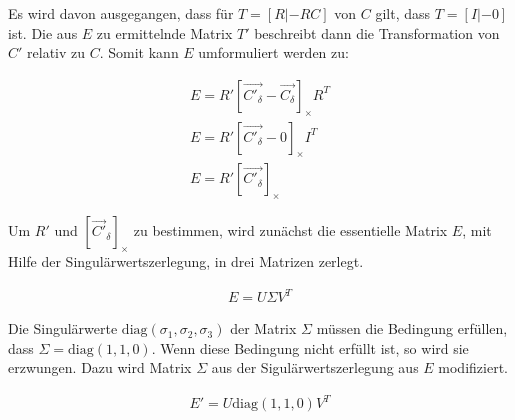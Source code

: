 %


Es wird davon ausgegangen, dass für $T = [R|-RC]$ von $C$ gilt, dass $T = [I|-0]$ ist. Die aus $E$ zu ermittelnde Matrix $T'$ beschreibt dann die Transformation von $C'$ relativ zu $C$\cite{HZ,Ferid}. Somit kann $E$ umformuliert werden zu:

\begin{gather}
	E = R'[\vec{C'_\delta} - \vec{C_\delta}]_\times R^T\\
	E = R'[\vec{C'_\delta} - 0]_\times I^T\\
	E = R'[\vec{C'_\delta}]_\times
\end{gather}


Um $R'$ und $[\vec{C'}_\delta]_\times$ zu bestimmen, wird zunächst die essentielle Matrix \ensuremath{E}, mit Hilfe der Singulärwertszerlegung, in drei Matrizen zerlegt. 

\begin{gather}
E = U\Sigma V^T
\end{gather}


Die Singulärwerte $\text{diag}(\sigma_1,\sigma_2,\sigma_3)$ der Matrix $\Sigma$ müssen die Bedingung erfüllen, dass $\Sigma = \text{diag}(1,1,0)$\cite{HZ,Ferid}. Wenn diese Bedingung nicht erfüllt ist, so wird sie erzwungen. Dazu wird Matrix $\Sigma$ aus der Sigulärwertszerlegung aus $E$ modifiziert\cite{HZ,Ferid}. 

\begin{gather}
	E' = U\text{diag}(1,1,0)V^T
\end{gather}  



%

